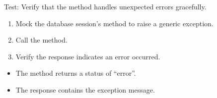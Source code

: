 \documentclass[letterpaper,10pt,english]{sphinxmanual}
\begin{document}
\begin{fulllineitems}
\label{\detokenize{test:test.test_admin.test_update_admin_email_unexpected_error}}
\pysigstartsignatures
\pysiglinewithargsret
{}
{\sphinxparamcomma {}}
{}
\pysigstopsignatures
\sphinxAtStartPar
Test: Verify that the method handles unexpected errors gracefully.
\begin{description}
\begin{enumerate}
%
\item {} 
\sphinxAtStartPar
Mock the database session’s  method to raise a generic exception.

\item {} 
\sphinxAtStartPar
Call the  method.

\item {} 
\sphinxAtStartPar
Verify the response indicates an error occurred.

\end{enumerate}

\begin{itemize}
\item {} 
\sphinxAtStartPar
The method returns a status of “error”.

\item {} 
\sphinxAtStartPar
The response contains the exception message.

\end{itemize}

\end{description}

\end{fulllineitems}

\end{document}
